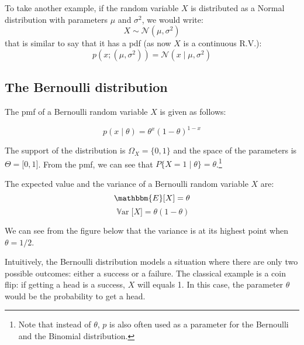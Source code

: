 \documentclass[12pt]{report}
\newcommand{\defobj}[1]{\color{red}#1\color{black}{}}
\newcommand{\defmean}[1]{\color{green!70!black}#1\color{black}{}}
\renewcommand{\emph}[1]{\color{violet}#1\color{black}{}}
\DeclareMathOperator{\Var}{\mathbb{V}\text{ar}}
\begin{document}
To take another example, if the random variable $ X $ is distributed as a Normal distribution with parameters $ \mu $ and $ \sigma^{2} $, we would write:
$$ X \sim \mathcal{N} (\mu, \sigma^{2}) $$
that is similar to say that it has a pdf (as now $X$ is a continuous R.V.):
$$ p(x ; (\mu, \sigma^{2})) = \mathcal{N} (x \mid \mu, \sigma^{2}) $$

\subsection{The Bernoulli distribution}
The \emph{pmf} of a \defobj{Bernoulli random variable} $ X $ is given as follows:

\defmean{$$ p(x \mid \theta) = \theta^x (1 - \theta)^{1 - x} $$}

The support of the distribution is $ \Omega_{X} = \{ 0, 1\} $ and the space of the parameters is $ \Theta = \lbrack 0, 1 \rbrack$. From the pmf, we can see that $ P \{ X = 1 \mid \theta \} = \theta $.\footnote{Note that instead of $ \theta $, $ p $  is also often used as a parameter for the Bernoulli and the Binomial distribution.}

The expected value and the variance of a Bernoulli random variable $ X $ are:
$$ \mathbbm{E}\lbrack X \rbrack = \theta $$
$$ \Var\lbrack X \rbrack = \theta (1 - \theta)$$

We can see from the figure below that the variance is at its highest point when $ \theta = 1/2 $.

\begin{figure}[H]\centering
\end{figure}


Intuitively, the Bernoulli distribution models a situation where there are only two possible outcomes: either a success or a failure. The classical example is a coin flip: if getting a head is a success, $ X $ will equals 1. In this case, the parameter $ \theta $ would be the probability to get a head.
\end{document}

